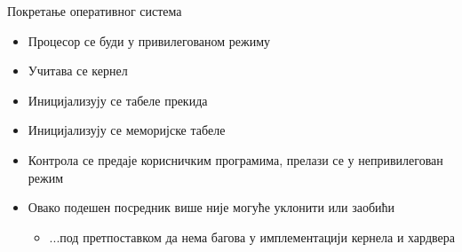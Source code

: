 \documentclass[xcolor=table]{beamer}
\begin{document}
    \begin{frame}{Покретање оперативног система}
        \begin{itemize}
            \item Процесор се буди у привилегованом режиму
            \item Учитава се кернел
            \item Иницијализују се табеле прекида
            \item Иницијализују се меморијске табеле
            \item Контрола се предаје корисничким програмима, прелази се у непривилегован режим
            \item Овако подешен посредник више није могуће уклонити или заобићи
            \begin{itemize}
                \item ...под претпоставком да нема багова у имплементацији кернела и хардвера
            \end{itemize}
        \end{itemize}
    \end{frame}
    
\end{document}
